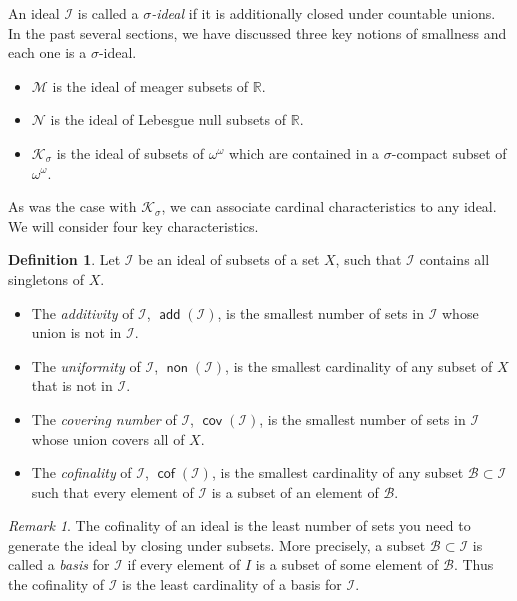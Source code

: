 \documentclass[11pt,oneside,a4paper]{amsbook}
\newcommand{\R}{\mathbb R}
\newcommand{\Null}{\mathcal N}
\newcommand{\Meager}{\mathcal M}
\newcommand{\Ksigma}{\mathcal K_\sigma}
\DeclareMathOperator{\add}{\mathsf{add}}
\DeclareMathOperator{\non}{\mathsf{non}}
\DeclareMathOperator{\cov}{\mathsf{cov}}
\DeclareMathOperator{\cof}{\mathsf{cof}}
\theoremstyle{definition}
\theoremstyle{plain}
\theoremstyle{definition}
\newtheorem{definition}[theorem]{Definition}
\theoremstyle{remark}
\newtheorem{remark}[theorem]{Remark}
\numberwithin{equation}{section}
\numberwithin{figure}{section}
\begin{document}
An ideal $\mathcal I$ is called a \emph{$\sigma$-ideal} if it is additionally closed under countable unions. In the past several sections, we have discussed three key notions of smallness and each one is a $\sigma$-ideal.
\begin{itemize}
  \item $\Meager$ is the ideal of meager subsets of $\R$.
  \item $\Null$ is the ideal of Lebesgue null subsets of $\R$.
  \item $\Ksigma$ is the ideal of subsets of $\omega^\omega$ which are contained in a $\sigma$-compact subset of $\omega^\omega$.
\end{itemize}

As was the case with $\Ksigma$, we can associate cardinal characteristics to any ideal. We will consider four key characteristics.

\begin{definition} Let $\mathcal I$ be an ideal of subsets of a set $X$, such that $\mathcal I$ contains all singletons of $X$.
  \begin{itemize}
  \item The \emph{additivity} of $\mathcal{I}$, $\add(\mathcal{I})$, is the smallest number of sets in $\mathcal{I}$ whose union is not in $\mathcal{I}$.
  \item The \emph{uniformity} of $\mathcal{I}$, $\non(\mathcal{I})$, is the smallest cardinality of any subset of $X$ that is not in $\mathcal{I}$.
  \item The \emph{covering number} of $\mathcal{I}$, $\cov(\mathcal{I})$, is the smallest number of sets in $\mathcal{I}$ whose union covers all of $X$.
  \item The \emph{cofinality} of $\mathcal{I}$, $\cof(\mathcal{I})$, is the smallest cardinality of any subset $\mathcal{B}\subset\mathcal{I}$ such that every element of $\mathcal{I}$ is a subset of an element of $\mathcal{B}$.
  \end{itemize}
\end{definition}

\begin{remark}
The cofinality of an ideal is the least number of sets you need to generate the ideal by closing under subsets. More precisely, a subset $\mathcal B\subset\mathcal I$ is called a \emph{basis} for $\mathcal I$ if every element of $I$ is a subset of some element of $\mathcal B$. Thus the cofinality of $\mathcal I$ is the least cardinality of a basis for $\mathcal I$.
\end{remark}
\end{document}
